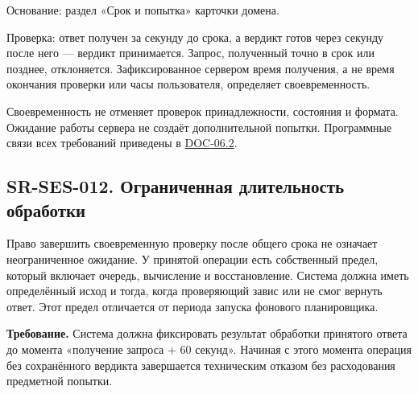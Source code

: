 \documentclass[12pt,a4paper]{article}
\begin{document}
Основание: раздел «Срок и попытка» карточки домена.

Проверка: ответ получен за секунду до срока, а вердикт готов через секунду после него --- вердикт принимается. Запрос, полученный точно в срок или позднее, отклоняется. Зафиксированное сервером время получения, а не время окончания проверки или часы пользователя, определяет своевременность.

Своевременность не отменяет проверок принадлежности, состояния и формата. Ожидание работы сервера не создаёт дополнительной попытки. Программные связи всех требований приведены в \href{../07_\%D0\%9F\%D1\%80\%D0\%BE\%D0\%B3\%D1\%80\%D0\%B0\%D0\%BC\%D0\%BC\%D0\%BD\%D1\%8B\%D0\%B5_\%D1\%82\%D1\%80\%D0\%B5\%D0\%B1\%D0\%BE\%D0\%B2\%D0\%B0\%D0\%BD\%D0\%B8\%D1\%8F/DOC-06.2_\%D0\%A1\%D0\%B5\%D1\%81\%D1\%81\%D0\%B8\%D0\%B8_\%D0\%B7\%D0\%B0\%D0\%B4\%D0\%B0\%D1\%87_\%D0\%B8_\%D0\%BF\%D0\%BB\%D0\%B0\%D0\%BD\%D0\%B8\%D1\%80\%D0\%BE\%D0\%B2\%D1\%89\%D0\%B8\%D0\%BA.pdf\#nameddest=6-\%D1\%82\%D1\%80\%D0\%B0\%D1\%81\%D1\%81\%D0\%B8\%D1\%80\%D0\%BE\%D0\%B2\%D0\%BA\%D0\%B0-\%D0\%B8-\%D0\%BE\%D0\%BF\%D0\%B8\%D1\%81\%D0\%B0\%D1\%82\%D0\%B5\%D0\%BB\%D1\%8C\%D0\%BD\%D1\%8B\%D0\%B5-\%D0\%BF\%D1\%80\%D0\%BE\%D0\%B2\%D0\%B5\%D1\%80\%D0\%BA\%D0\%B8}{DOC-06.2}.

\subsection{SR-SES-012. Ограниченная длительность обработки}\label{sr-ses-012-ux43eux433ux440ux430ux43dux438ux447ux435ux43dux43dux430ux44f-ux434ux43bux438ux442ux435ux43bux44cux43dux43eux441ux442ux44c-ux43eux431ux440ux430ux431ux43eux442ux43aux438}

\hypertarget{sr-ses-012-ограниченная-длительность-обработки}{}

Право завершить своевременную проверку после общего срока не означает неограниченное ожидание. У принятой операции есть собственный предел, который включает очередь, вычисление и восстановление. Система должна иметь определённый исход и тогда, когда проверяющий завис или не смог вернуть ответ. Этот предел отличается от периода запуска фонового планировщика.

\textbf{Требование.} Система должна фиксировать результат обработки принятого ответа до момента «получение запроса + 60 секунд». Начиная с этого момента операция без сохранённого вердикта завершается техническим отказом без расходования предметной попытки.
\end{document}
